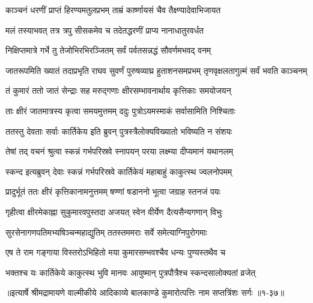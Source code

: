 \twolineshloka
{काञ्चनं धरणीं प्राप्तं हिरण्यमतुलप्रभम्}
{ताम्रं कार्ष्णायसं चैव तैक्ष्ण्यादेवाभिजायत} %

\twolineshloka
{मलं तस्याभवत् तत्र त्रपु सीसकमेव च}
{तदेतद्धरणीं प्राप्य नानाधातुरवर्धत} %

\twolineshloka
{निक्षिप्तमात्रे गर्भे तु तेजोभिरभिरञ्जितम्}
{सर्वं पर्वतसन्नद्धं सौवर्णमभवद् वनम्} %

\threelineshloka
{जातरूपमिति ख्यातं तदाप्रभृति राघव}
{सुवर्णं पुरुषव्याघ्र हुताशनसमप्रभम्}
{तृणवृक्षलतागुल्मं सर्वं भवति काञ्चनम्} %

\twolineshloka
{तं कुमारं ततो जातं सेन्द्राः सह मरुद्गणाः}
{क्षीरसम्भावनार्थाय कृत्तिकाः समयोजयन्} %

\twolineshloka
{ताः क्षीरं जातमात्रस्य कृत्वा समयमुत्तमम्}
{ददुः पुत्रोऽयमस्माकं सर्वासामिति निश्चिताः} %

\twolineshloka
{ततस्तु देवताः सर्वाः कार्तिकेय इति ब्रुवन्}
{पुत्रस्त्रैलोक्यविख्यातो भविष्यति न संशयः} %

\twolineshloka
{तेषां तद् वचनं श्रुत्वा स्कन्नं गर्भपरिस्रवे}
{स्नापयन् परया लक्ष्म्या दीप्यमानं यथानलम्} %

\twolineshloka
{स्कन्द इत्यब्रुवन् देवाः स्कन्नं गर्भपरिस्रवे}
{कार्तिकेयं महाबाहुं काकुत्स्थ ज्वलनोपमम्} %

\twolineshloka
{प्रादुर्भूतं ततः क्षीरं कृत्तिकानामनुत्तमम्}
{षण्णां षडाननो भूत्वा जग्राह स्तनजं पयः} %

\twolineshloka
{गृहीत्वा क्षीरमेकाह्ना सुकुमारवपुस्तदा}
{अजयत् स्वेन वीर्येण दैत्यसैन्यगणान् विभुः} %

\twolineshloka
{सुरसेनागणपतिमभ्यषिञ्चन्महाद्युतिम्}
{ततस्तममराः सर्वे समेत्याग्निपुरोगमाः} %

\twolineshloka
{एष ते राम गङ्गाया विस्तरोऽभिहितो मया}
{कुमारसम्भवश्चैव धन्यः पुण्यस्तथैव च} %

\twolineshloka
{भक्तश्च यः कार्तिकेये काकुत्स्थ भुवि मानवः}
{आयुष्मान् पुत्रपौत्रैश्च स्कन्दसालोक्यतां व्रजेत्} %


॥इत्यार्षे श्रीमद्रामायणे वाल्मीकीये आदिकाव्ये बालकाण्डे कुमारोत्पत्तिः नाम सप्तत्रिंशः सर्गः ॥१-३७॥
